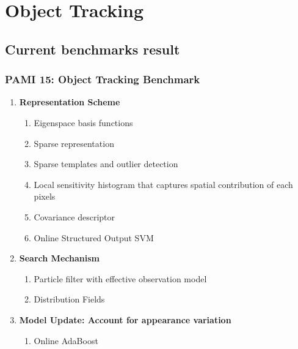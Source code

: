 \chapter{Object Tracking}

\section{Current benchmarks result}

\subsection{PAMI 15: Object Tracking Benchmark} \cite{wu2015object}

\begin{enumerate}

  \item \textbf{Representation Scheme}
    \begin{enumerate}
        \item Eigenspace basis functions \cite{black1998eigentracking}
        \item Sparse representation \cite{zhong2012robust}
        \item Sparse templates and outlier detection \cite{mei2011robust}
        \item Local sensitivity histogram that captures spatial contribution of each pixels \cite{he2013visual}
        \item Covariance descriptor \cite{tuzel2006region}
        \item Online Structured Output SVM \cite{hare2016struck}
    \end{enumerate}  

    \item \textbf{Search Mechanism}
        \begin{enumerate}
            \item Particle filter with effective observation model
            \item Distribution Fields \cite{sevilla2012distribution}
        \end{enumerate}
        
    \item \textbf{Model Update: Account for appearance variation}
        \begin{enumerate}
            \item Online AdaBoost \cite{grabner2006real}
        \end{enumerate}
    

\end{enumerate}
